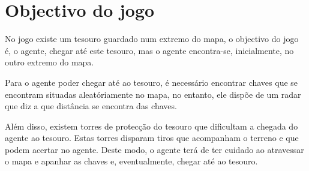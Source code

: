 \section{Objectivo do jogo}

	No jogo existe um tesouro guardado num extremo do mapa, o objectivo do jogo é, o agente,
chegar até este tesouro, mas o agente encontra-se, inicialmente, no outro extremo do mapa.
	
	Para o agente poder chegar até ao tesouro, é necessário encontrar chaves que se encontram 
situadas aleatóriamente no mapa, no entanto, ele dispõe de um radar que diz a que distância se 
encontra das chaves. 
	
	Além disso, existem torres de protecção do tesouro que dificultam a chegada do agente ao tesouro.
Estas torres disparam tiros que acompanham o terreno e que podem acertar no agente. Deste modo,
o agente terá de ter cuidado ao atravessar o mapa e apanhar as chaves e, eventualmente, chegar 
até ao tesouro.
